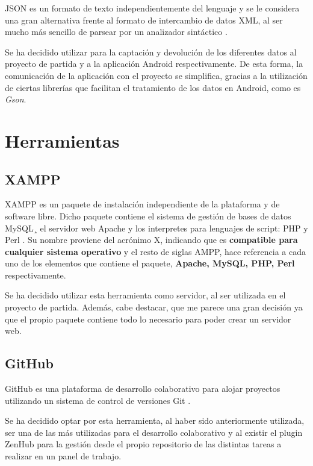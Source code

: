 JSON es un formato de texto independientemente del lenguaje y se le considera una gran alternativa frente al formato de intercambio de datos XML, al ser mucho más sencillo de parsear por un analizador sintáctico \cite{wiki:json2}.

Se ha decidido utilizar para la captación y devolución de los diferentes datos al proyecto de partida y a la aplicación Android respectivamente. De esta forma, la comunicación de la aplicación
con el proyecto se simplifica, gracias a la utilización de ciertas librerías que facilitan el tratamiento de los datos en Android, como es \emph{Gson}.


\section{Herramientas}

\subsection{XAMPP}

XAMPP es un paquete de instalación independiente de la plataforma y de software libre. Dicho paquete contiene el sistema de gestión de bases de datos MySQL¸ el servidor web Apache y los interpretes para lenguajes de script: PHP y Perl \cite{wiki:xampp}. Su nombre proviene del acrónimo X, indicando que es \textbf{compatible para cualquier sistema operativo} y el resto de siglas AMPP, hace referencia a cada uno de los elementos que contiene el paquete, \textbf{Apache, MySQL, PHP, Perl} respectivamente.

Se ha decidido utilizar esta herramienta como servidor, al ser utilizada en el proyecto de partida. Además, cabe destacar, que me parece una gran decisión ya que el propio paquete contiene todo lo necesario para poder crear un servidor web.

\subsection{GitHub}

GitHub es una plataforma de desarrollo colaborativo para alojar proyectos utilizando un sistema de control de versiones Git \cite{wiki:github}.

Se ha decidido optar por esta herramienta, al haber sido anteriormente utilizada, ser una de las más utilizadas para el desarrollo colaborativo y al existir el plugin ZenHub para la gestión desde el propio repositorio de las distintas tareas a realizar en un panel de trabajo.
 
